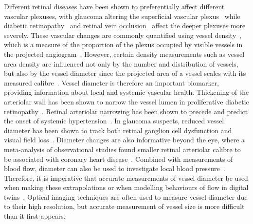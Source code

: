 
Different retinal diseases have been shown to preferentially affect different vascular plexuses, with glaucoma altering the superficial vascular plexus~\cite{takusagawaProjectionResolvedOptical2017} while diabetic retinopathy~\cite{hwangVisualization3Distinct2016} and retinal vein occlusion~\cite{coscasOpticalCoherenceTomography2016} affect the deeper plexuses more severely. These vascular changes are commonly quantified using vessel density~\cite{durbinQuantificationRetinalMicrovascular2017,yarmohammadiPeripapillaryMacularVessel2017,tzaridisQuantificationRetinalChoriocapillaris2019,kwapongRetinalMicrovascularImpairment2018}, which is a measure of the proportion of the plexus occupied by visible vessels in the projected angiogram~\cite{sampsonTowardsStandardizingRetinal2022,untrachtTowardsStandardisingRetinal2024}. However, certain density measurements such as vessel area density are influenced not only by the number and distribution of vessels, but also by the vessel diameter since the projected area of a vessel scales with its measured calibre~\cite{sampsonTowardsStandardizingRetinal2022,kimQuantifyingMicrovascularDensity2016}. Vessel diameter is therefore an important biomarker, providing information about local and systemic vascular health. Thickening of the arteriolar wall has been shown to narrow the vessel lumen in proliferative diabetic retinopathy~\cite{uenoAssociationChangesRetinal2021}. Retinal arteriolar narrowing has been shown to precede and predict the onset of systemic hypertension~\cite{ikramRetinalVesselDiameters2006}. In glaucoma suspects, reduced vessel diameter has been shown to track both retinal ganglion cell dysfunction and visual field loss~\cite{tirsiRetinalVesselDiameter2025}. Diameter changes are also informative beyond the eye, where a meta-analysis of observational studies found smaller retinal arteriolar calibre to be associated with coronary heart disease~\cite{liangRetinalVascularCaliber2022}. Combined with measurements of blood flow, diameter can also be used to investigate local blood pressure~\cite{mynardMeasurementAnalysisInterpretation2020,seabraSilicoBloodPressure2022}. Therefore, it is imperative that accurate measurements of vessel diameter be used when making these extrapolations or when modelling behaviours of flow in digital twins~\cite{hernandezLinkingVascularStructure2024,hernandezMicrovascularRetinalDigital2026}. Optical imaging techniques are often used to measure vessel diameter due to their high resolution, but accurate measurement of vessel size is more difficult than it first appears.

